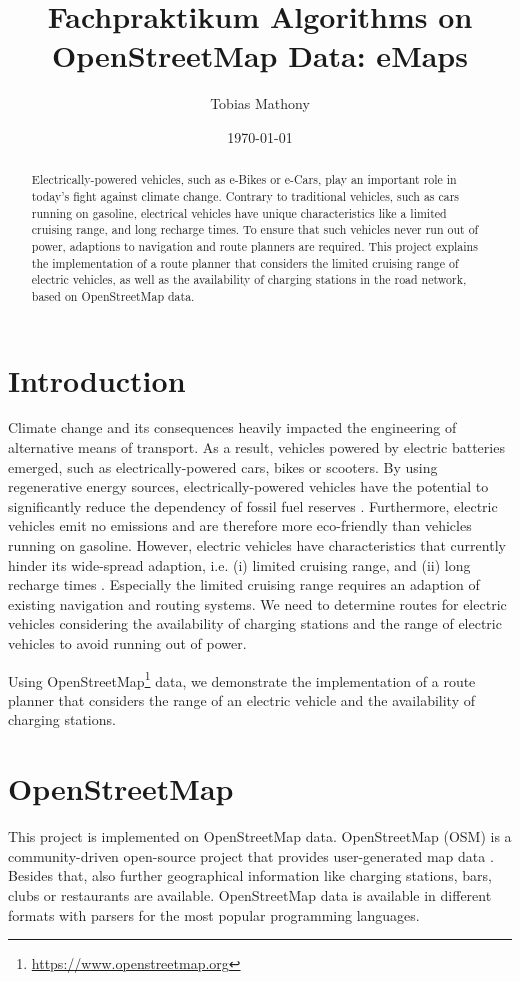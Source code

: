 \documentclass[a4paper]{article}
\author{Tobias Mathony}
\title{Fachpraktikum Algorithms on OpenStreetMap Data: eMaps}
\date{\today}
\begin{document}
\maketitle
\begin{abstract}
Electrically-powered vehicles, such as e-Bikes or e-Cars, play an important role in today's fight against climate change.
Contrary to traditional vehicles, such as cars running on gasoline, electrical vehicles have unique characteristics like a limited cruising range, and long recharge times.
To ensure that such vehicles never run out of power, adaptions to navigation and route planners are required.
This project explains the implementation of a route planner that considers the limited cruising range of electric vehicles, as well as the availability of charging stations in the road network, based on OpenStreetMap data. 
\end{abstract}
\section{Introduction}
Climate change and its consequences heavily impacted the engineering of alternative means of transport.
As a result, vehicles powered by electric batteries emerged, such as electrically-powered cars, bikes or scooters.
By using regenerative energy sources, electrically-powered vehicles have the potential to significantly reduce the dependency of fossil fuel reserves \cite{Artmeier2010}.
Furthermore, electric vehicles emit no emissions and are therefore more eco-friendly than vehicles running on gasoline.
However, electric vehicles have characteristics that currently hinder its wide-spread adaption, i.e. (i) limited cruising range, and (ii) long recharge times \cite{Artmeier2010}.
Especially the limited cruising range requires an adaption of existing navigation and routing systems.
We need to determine routes for electric vehicles considering the availability of charging stations and the range of electric vehicles to avoid running out of power.\par\medskip
Using OpenStreetMap\footnote{\url{https://www.openstreetmap.org}} data, we demonstrate the implementation of a route planner that considers the range of an electric vehicle and the availability of charging stations. 
\section{OpenStreetMap}
This project is implemented on OpenStreetMap data.
OpenStreetMap (OSM) is a community-driven open-source project that provides user-generated map data \cite{Haklay2008}.
Besides that, also further geographical information like charging stations, bars, clubs or restaurants are available.
OpenStreetMap data is available in different formats with parsers for the most popular programming languages.\par\medskip
\end{document}

